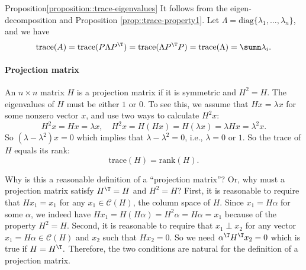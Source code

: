 \begin{myproof}{Proposition}{\ref{proposition::trace-eigenvalues}}
It follows from the eigen-decomposition and Proposition \ref{prop::trace-property1}. Let $\Lambda=\text{diag}\{\lambda_{1},\ldots,\lambda_{n}\}$,
and we have
$$
\text{trace}(A)  =\text{trace}(P\Lambda P^{\T})
  =\text{trace}(\Lambda P^{\T}P)
  =\text{trace}(\Lambda)
  =\sumn\lambda_{i}.
$$
\end{myproof}


\paragraph*{Projection matrix}

An $n\times n$ matrix $H$ is a projection matrix if it is symmetric and $H^{2}=H.$ The eigenvalues of $H$ must be either $1$ or $0$. To see this, we assume that $H x = \lambda x$ for some nonzero vector $x$, and use two ways to calculate $H^2x$:
$$
H^2x = Hx = \lambda x,\quad H^2x = H(Hx) = H(\lambda x ) = \lambda Hx =  \lambda^2 x.
$$
So $ (\lambda - \lambda^2) x = 0$ which implies that $\lambda - \lambda^2=0$, i.e., $\lambda = 0$ or $1$. 
%
So the trace of
$H$ equals its rank:
\[
\text{trace}(H)=\text{rank}(H).
\]

Why is this a reasonable definition of a ``projection matrix''? Or, why must a projection matrix
satisfy $H^{\T}=H$ and $H^{2}=H$? First, it is reasonable
to require that $Hx_{1}=x_{1}$ for any $x_{1} \in \mathcal{C}(H)$,
the column space of $H.$ Since $x_{1}=H\alpha$ for some $\alpha$,
we indeed have $Hx_{1}=H(H\alpha)=H^{2}\alpha=H\alpha=x_{1}$ because
of the property $H^{2}=H$. Second, it is reasonable to require that $x_{1}\perp x_{2}$
for any vector $x_{1}=H\alpha \in\mathcal{C}(H)$ and $x_{2}$ such that $Hx_{2}=0$.
So we need $\alpha^{\T}H^{\T}x_{2}=0$ which is true if $H=H^{\T}.$
Therefore, the two conditions are natural for the definition of a
projection matrix. 


